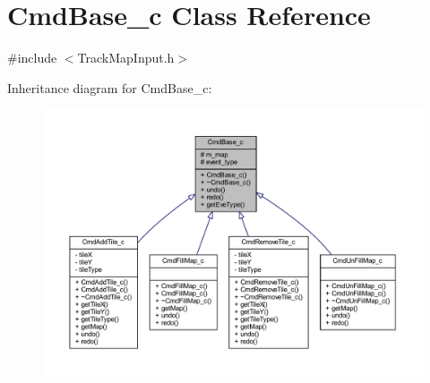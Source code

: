 \hypertarget{class_cmd_base__c}{\section{Cmd\+Base\+\_\+c Class Reference}
\label{class_cmd_base__c}
}


{\ttfamily \#include $<$Track\+Map\+Input.\+h$>$}



Inheritance diagram for Cmd\+Base\+\_\+c\+:\nopagebreak
\begin{figure}[H]
\begin{center}
\leavevmode
\includegraphics[width=350pt]{class_cmd_base__c__inherit__graph}
\end{center}
\end{figure}


